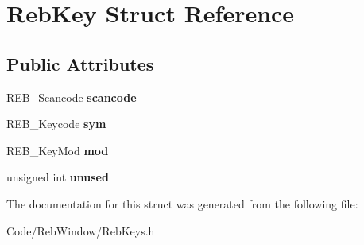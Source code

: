 \hypertarget{struct_reb_key}{}\section{Reb\+Key Struct Reference}
\label{struct_reb_key}
\subsection*{Public Attributes}
\begin{DoxyCompactItemize}
\item 
R\+E\+B\+\_\+\+Scancode {\bfseries scancode}\hypertarget{struct_reb_key_aef68e43c8e8e04d22c6f09f2d58af354}{}\label{struct_reb_key_aef68e43c8e8e04d22c6f09f2d58af354}

\item 
R\+E\+B\+\_\+\+Keycode {\bfseries sym}\hypertarget{struct_reb_key_a55a93c2f94883697e317519a935e8aca}{}\label{struct_reb_key_a55a93c2f94883697e317519a935e8aca}

\item 
R\+E\+B\+\_\+\+Key\+Mod {\bfseries mod}\hypertarget{struct_reb_key_adaebb76e7b08b0a9c2afed9bd077601f}{}\label{struct_reb_key_adaebb76e7b08b0a9c2afed9bd077601f}

\item 
unsigned int {\bfseries unused}\hypertarget{struct_reb_key_a6ba33fcc82fadd7aecc7e31ec27e9306}{}\label{struct_reb_key_a6ba33fcc82fadd7aecc7e31ec27e9306}

\end{DoxyCompactItemize}


The documentation for this struct was generated from the following file\+:\begin{DoxyCompactItemize}
\item 
Code/\+Reb\+Window/Reb\+Keys.\+h\end{DoxyCompactItemize}
